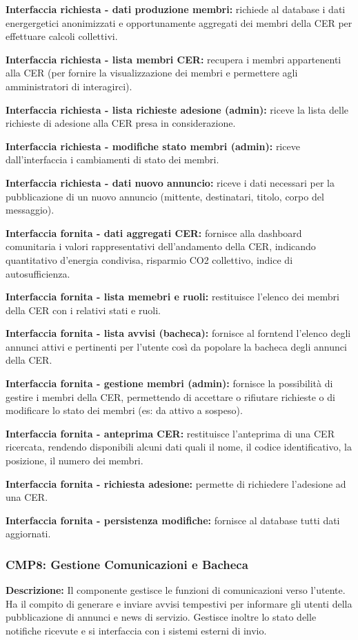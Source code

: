 \textbf{Interfaccia richiesta - dati produzione membri:}
richiede al database i dati energergetici anonimizzati e opportunamente aggregati dei membri
della CER per effettuare calcoli collettivi.

\textbf{Interfaccia richiesta - lista membri CER:}
recupera i membri appartenenti alla CER (per fornire la visualizzazione
dei membri e permettere agli amministratori di interagirci).

\textbf{Interfaccia richiesta - lista richieste adesione (admin):}
riceve la lista delle richieste di adesione alla CER presa in considerazione.

\textbf{Interfaccia richiesta - modifiche stato membri (admin):}
riceve dall'interfaccia i cambiamenti di stato dei membri.

\textbf{Interfaccia richiesta - dati nuovo annuncio:}
riceve i dati necessari per la pubblicazione di un nuovo annuncio (mittente, destinatari,
titolo, corpo del messaggio).

\textbf{Interfaccia fornita - dati aggregati CER:}
fornisce alla dashboard comunitaria i valori rappresentativi dell'andamento della CER, indicando
quantitativo d'energia condivisa, risparmio CO2 collettivo, indice di autosufficienza.

\textbf{Interfaccia fornita - lista memebri e ruoli:}
restituisce l'elenco dei membri della CER con i relativi stati e ruoli.

\textbf{Interfaccia fornita - lista avvisi (bacheca):}
fornisce al forntend l'elenco degli annunci attivi e pertinenti per l'utente così da popolare
la bacheca degli annunci della CER.

\textbf{Interfaccia fornita - gestione membri (admin):}
fornisce la possibilità di gestire i membri della CER, permettendo di accettare o rifiutare richieste o
di modificare lo stato dei membri (es: da attivo a sospeso).

\textbf{Interfaccia fornita - anteprima CER:}
restituisce l'anteprima di una CER ricercata, rendendo disponibili alcuni dati quali il nome,
il codice identificativo, la posizione, il numero dei membri.

\textbf{Interfaccia fornita - richiesta adesione:}
permette di richiedere l'adesione ad una CER.

\textbf{Interfaccia fornita - persistenza modifiche:}
fornisce al database tutti dati aggiornati.

\subsubsection*{CMP8: Gestione Comunicazioni e Bacheca}
\textbf{Descrizione:} Il componente gestisce le funzioni di comunicazioni verso l'utente.
Ha il compito di generare e inviare avvisi tempestivi per informare gli utenti della pubblicazione di annunci e news di
servizio. Gestisce inoltre lo stato delle notifiche ricevute e si
interfaccia con i sistemi esterni di invio.

